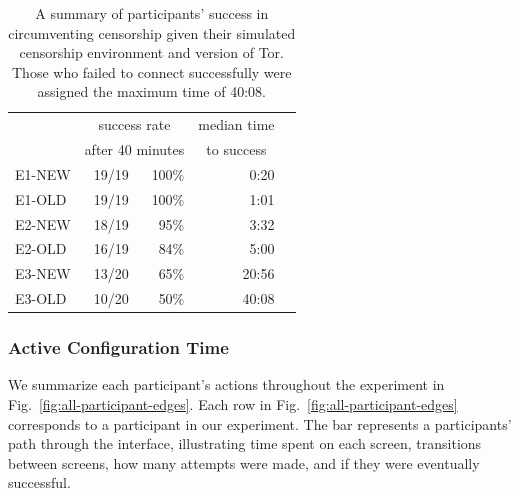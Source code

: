 \documentclass[USenglish,oneside,twocolumn]{article}
\begin{document}
\begin{table}
\centering
	\begin{tabular}{l r r r r}
	& \multicolumn{2}{c}{success rate} & \multicolumn{1}{c}{median time} \\
	& \multicolumn{2}{c}{after 40 minutes} & \multicolumn{1}{c}{to success} \\
	\noalign{\hrule}
	E1-NEW & 19/19 & 100\% & 0:20 \\ %
	E1-OLD & 19/19 & 100\% & 1:01 \\ %
	E2-NEW & 18/19 & 95\% & 3:32 \\ %
	E2-OLD & 16/19 & 84\% & 5:00 \\ %
	E3-NEW & 13/20 & 65\% & 20:56 \\ %
	E3-OLD & 10/20 & 50\% & 40:08 \\ %
	\end{tabular}
\caption{
A summary of participants' success in circumventing censorship
given their simulated censorship environment and version of Tor. Those who
failed to connect successfully were assigned the maximum time of 40:08.
}
\label{table:participant-summary}
\end{table}

\subsubsection{Active Configuration Time} 
We summarize each participant's actions throughout the experiment in Fig.~\ref{fig:all-participant-edges}. Each row in Fig.~\ref{fig:all-participant-edges} corresponds to a participant in our experiment. The bar represents a participants' path through the interface, illustrating time spent on each screen, transitions between screens, how many attempts were made, and if they were eventually successful. 
\end{document}
